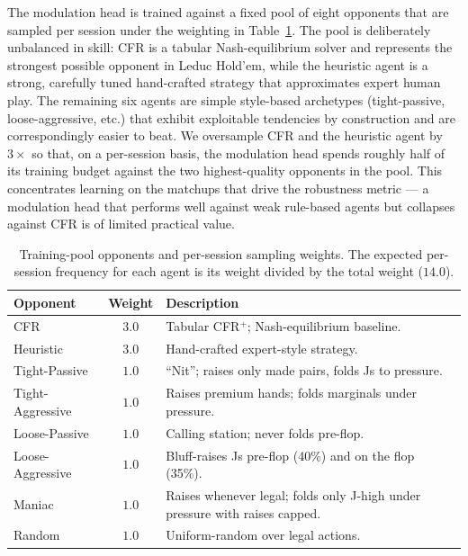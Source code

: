 The modulation head is trained against a fixed pool of eight opponents
that are sampled per session under the weighting in
Table~\ref{tab:train-pool}. The pool is deliberately unbalanced in skill:
CFR is a tabular Nash-equilibrium solver and represents the strongest
possible opponent in Leduc Hold'em, while the heuristic agent is a
strong, carefully tuned hand-crafted strategy that approximates expert
human play. The remaining six agents are simple style-based archetypes
(tight-passive, loose-aggressive, etc.) that exhibit exploitable
tendencies by construction and are correspondingly easier to beat. We
oversample CFR and the heuristic agent by $3\times$ so that, on a
per-session basis, the modulation head spends roughly half of its
training budget against the two highest-quality opponents in the pool.
This concentrates learning on the matchups that drive the robustness
metric --- a modulation head that performs well against weak rule-based
agents but collapses against CFR is of limited practical value.

\begin{table}[h]
\centering
\caption{Training-pool opponents and per-session sampling weights.
The expected per-session frequency for each agent is its weight divided
by the total weight ($14.0$).}
\label{tab:train-pool}
\begin{tabular}{lcl}
\toprule
\textbf{Opponent} & \textbf{Weight} & \textbf{Description} \\
\midrule
CFR              & $3.0$ & Tabular CFR$^+$; Nash-equilibrium baseline. \\
Heuristic        & $3.0$ & Hand-crafted expert-style strategy. \\
Tight-Passive    & $1.0$ & ``Nit''; raises only made pairs, folds Js to pressure. \\
Tight-Aggressive & $1.0$ & Raises premium hands; folds marginals under pressure. \\
Loose-Passive    & $1.0$ & Calling station; never folds pre-flop. \\
Loose-Aggressive & $1.0$ & Bluff-raises Js pre-flop (40\%) and on the flop (35\%). \\
Maniac           & $1.0$ & Raises whenever legal; folds only J-high under pressure with raises capped. \\
Random           & $1.0$ & Uniform-random over legal actions. \\
\bottomrule
\end{tabular}
\end{table}

